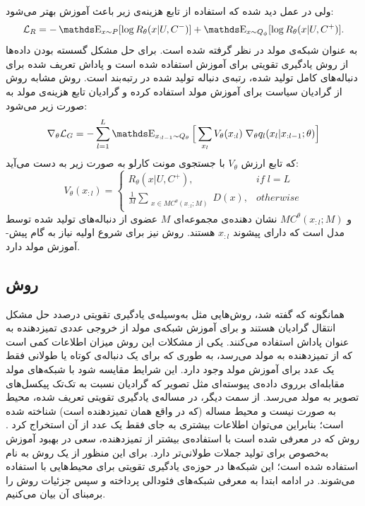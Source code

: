 ولی در عمل دید شده که استفاده از تابع هزینه‌ی زیر باعث آموزش بهتر می‌شود:
\begin{equation}
\mathcal{L}_R = - \ME_{x \sim P} [\log R_\theta (x | U , C^-)] + \ME_{x \sim Q_\phi} [\log R_\theta (x|U,C^+)].
\end{equation}
\newline
 به عنوان شبکه‌ی مولد در نظر گرفته شده است. برای حل مشکل گسسته بودن داده‌ها از روش یادگیری تقویتی برای آموزش استفاده شده است و پاداش تعریف شده برای دنباله‌های کامل تولید شده، رتبه‌ی دنباله تولید شده در رتبه‌بند است.
روش
مشابه روش
از گرادیان سیاست برای آموزش مولد استفاده کرده و گرادیان تابع هزینه‌ی مولد به صورت زیر می‌شود:
\begin{equation}
\nabla_\theta \mathcal{L}_G = - \sum_{l=1}^L   \ME_{x_{:l-1} \sim Q_\theta} \Big[ \sum_{x_l} V_\theta(x_{:l}) \; \nabla_\theta q_l(x_l | x_{:l-1}; \theta) \Big]
\end{equation}
که تابع ارزش
$V_\theta$
با جستجوی مونت کارلو به صورت زیر به دست می‌آید:
 \begin{equation}
 V_\theta(x_{:l}) = 
 \begin{cases}
  R_\theta (x | U, C^+)  ,&   if \; l = L\\
 \frac{1}{M} \sum_{\substack{x \in MC^{\theta}(x_{:l}; M)}}D(x) ,&  otherwise
 \end{cases}
 \end{equation}
و
 $MC^{\theta}(x_{:l}; M)$
 نشان دهنده‌ی مجموعه‌ای $M$ عضوی از دنباله‌های تولید شده توسط مدل است که دارای پیشوند
 $x_{:l}$
هستند.
\newline
روش
نیز برای شروع اولیه نیاز به گام پیش-آموزش مولد دارد.
\subsection{ روش }\label{Method:LeakGAN}
همانگونه که گفته شد، روش‌هایی مثل
به‌وسیله‌ی یادگیری تقویتی درصدد حل مشکل انتقال گرادیان هستند و برای آموزش شبکه‌ی مولد از خروجی عددی تمیزدهنده به عنوان پاداش استفاده می‌کنند.
یکی از مشکلات این روش میزان اطلاعات کمی است که از تمیزدهنده به مولد می‌رسد، به طوری که برای یک دنباله‌ی کوتاه یا طولانی فقط یک عدد برای آموزش مولد وجود دارد. این شرایط مقایسه شود با شبکه‌های مولد مقابله‌ای برروی داد‌ه‌ی پیوسته‌ای مثل تصویر که گرادیان نسبت به تک‌تک پیکسل‌های تصویر به مولد می‌رسد.
از سمت دیگر، در مساله‌ی یادگیری تقویتی تعریف شده، محیط به صورت 
نیست و محیط مساله (که در واقع همان تمیزدهنده است)‌ شناخته شده است؛ بنابراین می‌توان اطلاعات بیشتری به جای فقط یک عدد از آن استخراج کرد
\cite{Guo2018}.
\newline
روش
که در 
\cite{Guo2018}
معرفی شده است با استفاده‌ی بیشتر از تمیزدهنده، سعی در بهبود آموزش به‌خصوص برای تولید جملات طولانی‌تر دارد. برای این منظور از یک روش
به نام
\cite{FeudalNet}
استفاده شده است؛ این شبکه‌ها در حوزه‌ی یادگیری تقویتی برای محیط‌هایی با
استفاده می‌شوند. در ادامه ابتدا به معرفی شبکه‌های فئودالی پرداخته و سپس جزئیات روش
را برمبنای آن بیان می‌کنیم.
